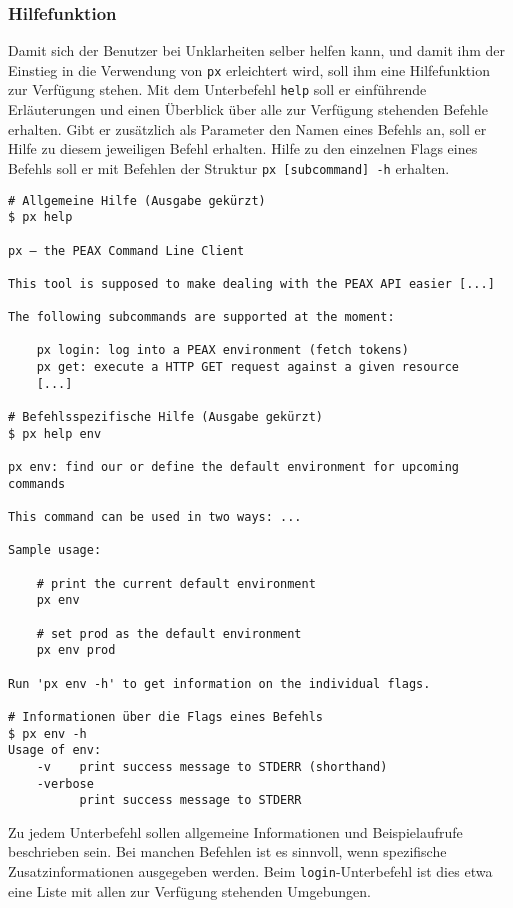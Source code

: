 \subsubsection{Hilfefunktion}

Damit sich der Benutzer bei Unklarheiten selber helfen kann, und damit ihm der Einstieg in die Verwendung von \texttt{px} erleichtert wird, soll ihm eine Hilfefunktion zur Verfügung stehen. Mit dem Unterbefehl \texttt{help} soll er einführende Erläuterungen und einen Überblick über alle zur Verfügung stehenden Befehle erhalten. Gibt er zusätzlich als Parameter den Namen eines Befehls an, soll er Hilfe zu diesem jeweiligen Befehl erhalten. Hilfe zu den einzelnen Flags eines Befehls soll er mit Befehlen der Struktur \texttt{px [subcommand] -h} erhalten.

\begin{lstlisting}[caption={Verwendung der Hilfefunktion}]
# Allgemeine Hilfe (Ausgabe gekürzt)
$ px help

px ‒ the PEAX Command Line Client

This tool is supposed to make dealing with the PEAX API easier [...]

The following subcommands are supported at the moment:

    px login: log into a PEAX environment (fetch tokens)
    px get: execute a HTTP GET request against a given resource
    [...]

# Befehlsspezifische Hilfe (Ausgabe gekürzt)
$ px help env

px env: find our or define the default environment for upcoming commands

This command can be used in two ways: ...

Sample usage:

    # print the current default environment
    px env

    # set prod as the default environment
    px env prod

Run 'px env -h' to get information on the individual flags.

# Informationen über die Flags eines Befehls
$ px env -h
Usage of env:
    -v    print success message to STDERR (shorthand)
    -verbose
          print success message to STDERR
\end{lstlisting}

Zu jedem Unterbefehl sollen allgemeine Informationen und Beispielaufrufe beschrieben sein. Bei manchen Befehlen ist es sinnvoll, wenn spezifische Zusatzinformationen ausgegeben werden. Beim \texttt{login}-Unterbefehl ist dies etwa eine Liste mit allen zur Verfügung stehenden Umgebungen.

